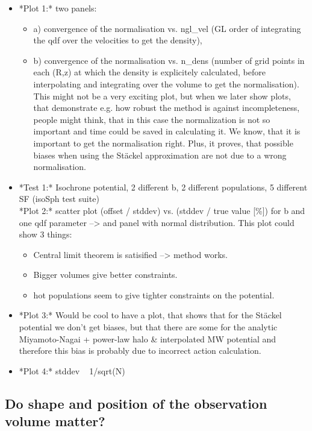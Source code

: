 \documentclass[12pt,preprint]{aastex}
\begin{document}
\begin{itemize}
\item *Plot 1:* two panels: 
\begin{itemize}
\item a) convergence of the normalisation vs. ngl\_vel (GL order of integrating the qdf over the velocities to get the density), 
\item b) convergence of the normalisation vs. n\_dens (number of grid points in each (R,z) at which the density is explicitely calculated, before interpolating and integrating over the volume to get the normalisation). \\ 
 This might not be a very exciting plot, but when we later show plots, that demonstrate e.g. how robust the method is against incompleteness, people might think, that in this case the normalization is not so important and time could be saved in calculating it. We know, that it is important to get the normalisation right. Plus, it proves, that possible biases when using the St\"ackel approximation are not due to a wrong normalisation.
 \end{itemize}
\item *Test 1:* Isochrone potential, 2 different b, 2 different populations, 5 different SF (isoSph test suite) \\
*Plot 2:* scatter plot (offset / stddev) vs. (stddev / true value [\%]) for b and one qdf parameter --> and panel with normal distribution. This plot could show 3 things:
\begin{itemize}
\item Central limit theorem is satisified --> method works.
\item Bigger volumes give better constraints.
\item hot populations seem to give tighter constraints on the potential.
\end{itemize}
\item *Plot 3:* Would be cool to have a plot, that shows that for the St\"ackel potential we don't get biases, but that there are some for the analytic Miyamoto-Nagai + power-law halo \& interpolated MW potential and therefore this bias is probably due to incorrect action calculation.
\item *Plot 4:* stddev ~ 1/sqrt(N)
\end{itemize}


\subsection{Do shape and position of the observation volume matter?}
\end{document}
